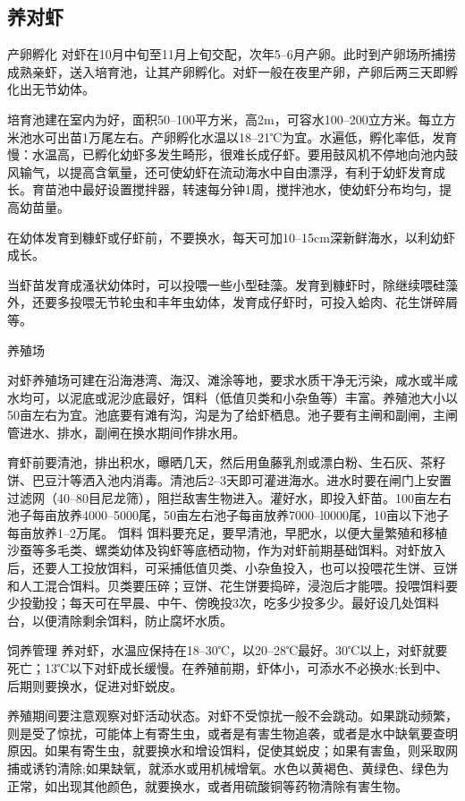 \documentclass{ctexbook}
\begin{document}
\subsection{养对虾}
产卵孵化
对虾在10月中旬至11月上旬交配，次年5--6月产卵。此时到产卵场所捕捞成熟亲虾，送入培育池，让其产卵孵化。对虾一般在夜里产卵，产卵后两三天即孵化出无节幼体。

培育池建在室内为好，面积50--100平方米，高2m，可容水100--200立方米。每立方米池水可出苗1万尾左右。产卵孵化水温以18--21℃为宜。水遍低，孵化率低，发育慢：水温高，已孵化幼虾多发生畸形，很难长成仔虾。要用鼓风机不停地向池内鼓风输气，以提高含氧量，还可使幼虾在流动海水中自由漂浮，有利于幼虾发育成长。育苗池中最好设置搅拌器，转速每分钟1周，搅拌池水，使幼虾分布均匀，提高幼苗量。

在幼体发育到糠虾或仔虾前，不要换水，每天可加10--15cm深新鲜海水，以利幼虾成长。

当虾苗发育成溞状幼体时，可以投喂一些小型硅藻。发育到糠虾时，除继续喂硅藻外，还要多投喂无节轮虫和丰年虫幼体，发育成仔虾时，可投入蛤肉、花生饼碎屑等。

养殖场

对虾养殖场可建在沿海港湾、海汉、滩涂等地，要求水质干净无污染，咸水或半咸水均可，以泥底或泥沙底最好，饵料（低值贝类和小杂鱼等）丰富。养殖池大小以50亩左右为宜。池底要有滩有沟，沟是为了给虾栖息。池子要有主闸和副闸，主闸管进水、排水，副闸在换水期间作排水用。

育虾前要清池，排出积水，曝晒几天，然后用鱼藤乳剂或漂白粉、生石灰、茶籽饼、巴豆汁等洒入池内消毒。清池后2--3天即可灌进海水。进水时要在闸门上安置过滤网（40--80目尼龙筛），阻拦敌害生物进入。灌好水，即投入虾苗。100亩左右池子每亩放养4000--5000尾，50亩左右池子每亩放养7000--l0000尾，10亩以下池子每亩放养1--2万尾。
饵料
饵料要充足，要早清池，早肥水，以便大量繁殖和移植沙蚕等多毛类、螺类幼体及钩虾等底栖动物，作为对虾前期基础饵料。对虾放入后，还要人工投放饵料，可采捕低值贝类、小杂鱼投入，也可以投喂花生饼、豆饼和人工混合饵料。贝类要压碎；豆饼、花生饼要捣碎，浸泡后才能喂。投喂饵料要少投勤投；每天可在早晨、中午、傍晚投3次，吃多少投多少。最好设几处饵料台，以便清除剩余饵料，防止腐坏水质。

饲养管理
养对虾，水温应保持在18--30℃，以20--28℃最好。30℃以上，对虾就要死亡；13℃以下对虾成长缓慢。在养殖前期，虾体小，可添水不必换水;长到中、后期则要换水，促进对虾蜕皮。

养殖期间要注意观察对虾活动状态。对虾不受惊扰一般不会跳动。如果跳动频繁，则是受了惊扰，可能体上有寄生虫，或者是有害生物追袭，或者是水中缺氧要查明原因。如果有寄生虫，就要换水和增设饵料，促使其蜕皮；如果有害鱼，则采取网捕或诱钓清除;如果缺氧，就添水或用机械增氧。水色以黄褐色、黄绿色、绿色为正常，如出现其他颜色，就要换水，或者用硫酸铜等药物清除有害生物。
\end{document}
